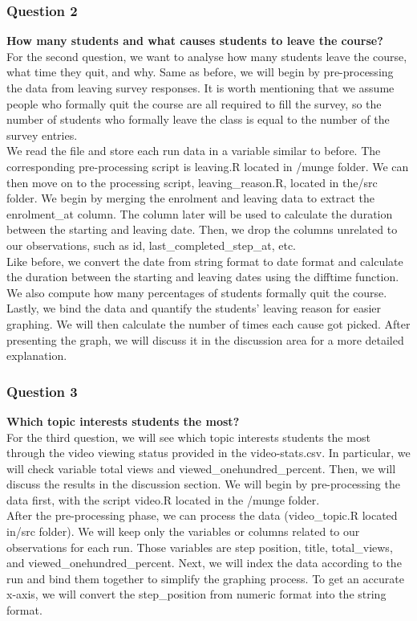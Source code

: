 \documentclass[12pt,]{article}
\begin{document}
\hypertarget{question-2}{%
\subsubsection{Question 2}\label{question-2}}

\textbf{How many students and what causes students to leave the
course?}\\
\hfill\break For the second question, we want to analyse how many
students leave the course, what time they quit, and why. Same as before,
we will begin by pre-processing the data from leaving survey responses.
It is worth mentioning that we assume people who formally quit the
course are all required to fill the survey, so the number of students
who formally leave the class is equal to the number of the survey
entries.\\
\hfill\break We read the file and store each run data in a variable
similar to before. The corresponding pre-processing script is leaving.R
located in /munge folder. We can then move on to the processing script,
leaving\_reason.R, located in the/src folder. We begin by merging the
enrolment and leaving data to extract the enrolment\_at column. The
column later will be used to calculate the duration between the starting
and leaving date. Then, we drop the columns unrelated to our
observations, such as id, last\_completed\_step\_at, etc.\\
\hfill\break Like before, we convert the date from string format to date
format and calculate the duration between the starting and leaving dates
using the difftime function. We also compute how many percentages of
students formally quit the course. Lastly, we bind the data and quantify
the students' leaving reason for easier graphing. We will then calculate
the number of times each cause got picked. After presenting the graph,
we will discuss it in the discussion area for a more detailed
explanation.

\hypertarget{question-3}{%
\subsubsection{Question 3}\label{question-3}}

\textbf{Which topic interests students the most?}\\
\hfill\break For the third question, we will see which topic interests
students the most through the video viewing status provided in the
video-stats.csv. In particular, we will check variable total views and
viewed\_onehundred\_percent. Then, we will discuss the results in the
discussion section. We will begin by pre-processing the data first, with
the script video.R located in the /munge folder.\\
\hfill\break After the pre-processing phase, we can process the data
(video\_topic.R located in/src folder). We will keep only the variables
or columns related to our observations for each run. Those variables are
step position, title, total\_views, and viewed\_onehundred\_percent.
Next, we will index the data according to the run and bind them together
to simplify the graphing process. To get an accurate x-axis, we will
convert the step\_position from numeric format into the string format.
\end{document}
